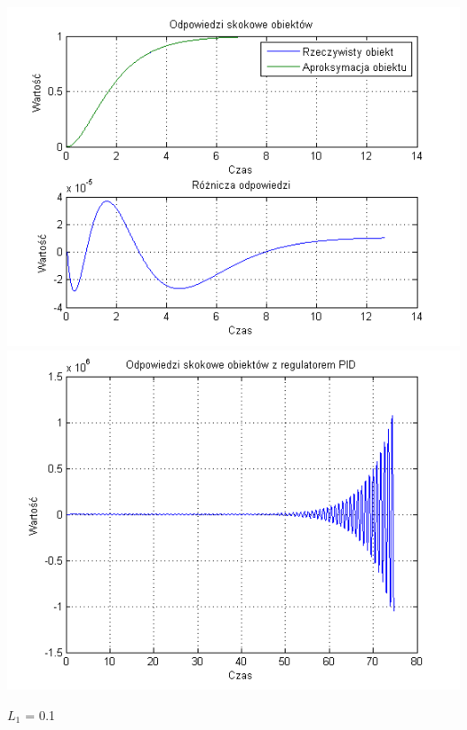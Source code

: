 \documentclass[10pt,a4paper]{article}
\begin{document}
\begin{center}
\includegraphics[scale=1]{images/dwa/skrypt_157.png}\\
\includegraphics[scale=1]{images/dwa/skrypt_158.png}\\
\end{center}
\newpage
$L_1$ = 0.1
\end{document}
